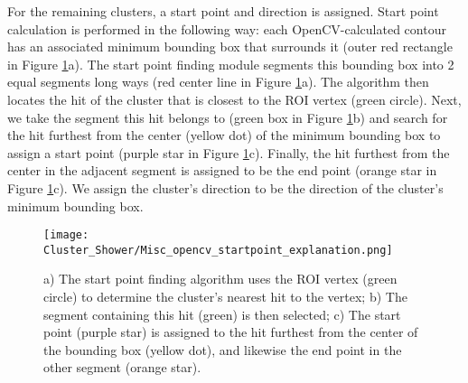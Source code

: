 

\par For the remaining clusters, a start point and direction is assigned. Start point calculation is performed in the following way: each OpenCV-calculated contour has an associated minimum bounding box \cite{bib:minAreaRect} that surrounds it (outer red rectangle in Figure \ref{fig:misc_opencv_startpoint}a). The start point finding module segments this bounding box into 2 equal segments long ways (red center line in Figure \ref{fig:misc_opencv_startpoint}a). The algorithm then locates the hit of the cluster that is closest to the ROI vertex (green circle).  Next, we take the segment this hit belongs to (green box in Figure \ref{fig:misc_opencv_startpoint}b) and search for the hit furthest from the center (yellow dot) of the minimum bounding box to assign a start point (purple star in Figure \ref{fig:misc_opencv_startpoint}c). Finally, the hit furthest from the center in the adjacent segment is assigned to be the end point (orange star in Figure \ref{fig:misc_opencv_startpoint}c). We assign the cluster's direction to be the direction of the cluster's minimum bounding box.

\begin{figure}[h!]
\centering
\texttt{[image: Cluster\_Shower/Misc\_opencv\_startpoint\_explanation.png]}
\caption{ a) The start point finding algorithm uses the ROI vertex (green circle) to determine the
cluster’s nearest hit to the vertex; b) The segment containing this hit (green) is then selected; c) The
start point (purple star) is assigned to the hit furthest from the center of the bounding box (yellow
dot), and likewise the end point in the other segment (orange star). }
\label{fig:misc_opencv_startpoint}
\end{figure}

